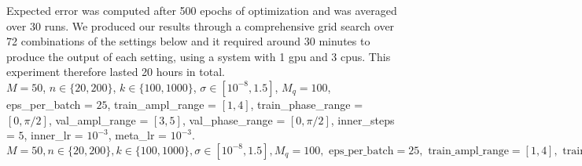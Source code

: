 Expected error was computed after 500 epochs of optimization and was averaged over 30 runs. We produced our results through a comprehensive grid search over 72 combinations of the settings below and it required around 30 minutes to produce the output of each setting, using a system with 1 gpu and 3 cpus. This experiment therefore lasted 20 hours in total.
\\
\iflatexml
$M=50$, $n \in \{20, 200\}$, $k \in \{100,1000\}$,
$\sigma \in [ 10^{-8}, 1.5]$,
$M_q = 100$, 
eps\_per\_batch = $25$,
train\_ampl\_range = $[1,4]$,
train\_phase\_range = $[0, \pi / 2 ]$,
val\_ampl\_range = $[3,5]$,
val\_phase\_range = $[0, \pi / 2 ]$,
inner\_steps = $5$,
inner\_lr = $10^{-3}$,
meta\_lr = $10^{-3}$.
\else
$M=50, n \in \{20, 200\} , k \in \{100,1000\},
\sigma \in [ 10^{-8}, 1.5],
M_q = 100 , \text{ eps\_per\_batch} = 25, \text{ train\_ampl\_range} = [1,4] ,
\text{ train\_phase\_range} =[0, \pi / 2 ],
\text{ val\_ampl\_range} = [3,5],
\text{ val\_phase\_range}= [0, \pi / 2 ],
\text{ inner\_steps} =  5,
\text{ inner\_lr} = 10^{-3},
\text{ meta\_lr} = 10^{-3} $
\fi